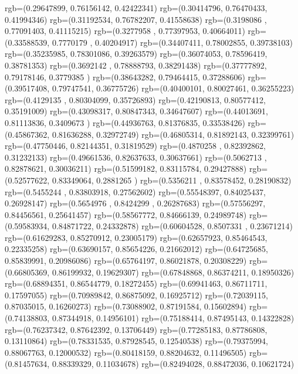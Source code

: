 {{{		  rgb=(0.29647899,  0.76156142,  0.42422341)
		  rgb=(0.30414796,  0.76470433,  0.41994346)
		  rgb=(0.31192534,  0.76782207,  0.41558638)
		  rgb=(0.3198086 ,  0.77091403,  0.41115215)
		  rgb=(0.3277958 ,  0.77397953,  0.40664011)
		  rgb=(0.33588539,  0.7770179 ,  0.40204917)
		  rgb=(0.34407411,  0.78002855,  0.39738103)
		  rgb=(0.35235985,  0.78301086,  0.39263579)
		  rgb=(0.36074053,  0.78596419,  0.38781353)
		  rgb=(0.3692142 ,  0.78888793,  0.38291438)
		  rgb=(0.37777892,  0.79178146,  0.3779385 )
		  rgb=(0.38643282,  0.79464415,  0.37288606)
		  rgb=(0.39517408,  0.79747541,  0.36775726)
		  rgb=(0.40400101,  0.80027461,  0.36255223)
		  rgb=(0.4129135 ,  0.80304099,  0.35726893)
		  rgb=(0.42190813,  0.80577412,  0.35191009)
		  rgb=(0.43098317,  0.80847343,  0.34647607)
		  rgb=(0.44013691,  0.81113836,  0.3409673 )
		  rgb=(0.44936763,  0.81376835,  0.33538426)
		  rgb=(0.45867362,  0.81636288,  0.32972749)
		  rgb=(0.46805314,  0.81892143,  0.32399761)
		  rgb=(0.47750446,  0.82144351,  0.31819529)
		  rgb=(0.4870258 ,  0.82392862,  0.31232133)
		  rgb=(0.49661536,  0.82637633,  0.30637661)
		  rgb=(0.5062713 ,  0.82878621,  0.30036211)
		  rgb=(0.51599182,  0.83115784,  0.29427888)
		  rgb=(0.52577622,  0.83349064,  0.2881265 )
		  rgb=(0.5356211 ,  0.83578452,  0.28190832)
		  rgb=(0.5455244 ,  0.83803918,  0.27562602)
		  rgb=(0.55548397,  0.84025437,  0.26928147)
		  rgb=(0.5654976 ,  0.8424299 ,  0.26287683)
		  rgb=(0.57556297,  0.84456561,  0.25641457)
		  rgb=(0.58567772,  0.84666139,  0.24989748)
		  rgb=(0.59583934,  0.84871722,  0.24332878)
		  rgb=(0.60604528,  0.8507331 ,  0.23671214)
		  rgb=(0.61629283,  0.85270912,  0.23005179)
		  rgb=(0.62657923,  0.85464543,  0.22335258)
		  rgb=(0.63690157,  0.85654226,  0.21662012)
		  rgb=(0.64725685,  0.85839991,  0.20986086)
		  rgb=(0.65764197,  0.86021878,  0.20308229)
		  rgb=(0.66805369,  0.86199932,  0.19629307)
		  rgb=(0.67848868,  0.86374211,  0.18950326)
		  rgb=(0.68894351,  0.86544779,  0.18272455)
		  rgb=(0.69941463,  0.86711711,  0.17597055)
		  rgb=(0.70989842,  0.86875092,  0.16925712)
		  rgb=(0.72039115,  0.87035015,  0.16260273)
		  rgb=(0.73088902,  0.87191584,  0.15602894)
		  rgb=(0.74138803,  0.87344918,  0.14956101)
		  rgb=(0.75188414,  0.87495143,  0.14322828)
		  rgb=(0.76237342,  0.87642392,  0.13706449)
		  rgb=(0.77285183,  0.87786808,  0.13110864)
		  rgb=(0.78331535,  0.87928545,  0.12540538)
		  rgb=(0.79375994,  0.88067763,  0.12000532)
		  rgb=(0.80418159,  0.88204632,  0.11496505)
		  rgb=(0.81457634,  0.88339329,  0.11034678)
		  rgb=(0.82494028,  0.88472036,  0.10621724)
}}}

